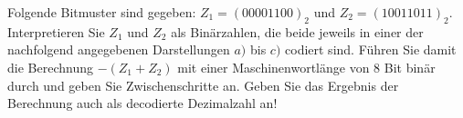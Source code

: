 \documentclass[a4paper, margins=3cm, newpage]{homework}
\begin{document}
\begin{problem}
	Folgende Bitmuster sind gegeben: \(Z_1 = (00001100)_2\) und \(Z_2 = (10011011)_2\).
	Interpretieren Sie $Z_1$ und $Z_2$ als Binärzahlen, die beide jeweils in einer der nachfolgend angegebenen Darstellungen $a)$ bis $c)$ codiert sind. Führen Sie damit die Berechnung $-(Z_1 + Z_2)$
	mit einer Maschinenwortlänge von 8 Bit binär durch und geben Sie Zwischenschritte an. Geben Sie das Ergebnis der Berechnung auch als decodierte Dezimalzahl an! 
\end{problem}
\end{document}
